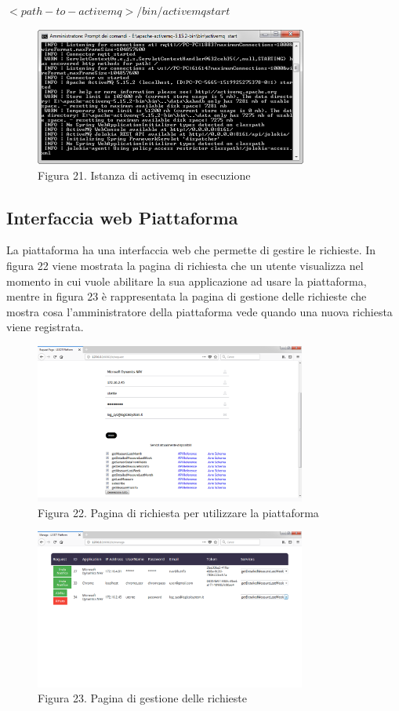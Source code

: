 $<path-to-activemq>/bin/activemq start$
\begin{figure}[h]
	\centering
	\includegraphics[width=0.8\textwidth]{activemq-in-esecuzione.png}
	\caption*{Figura 21. Istanza di activemq in esecuzione}
\end{figure}
\subsection{Interfaccia web Piattaforma}
La piattaforma ha una interfaccia web che permette di gestire le richieste. In figura 22 viene mostrata la pagina di richiesta che un utente visualizza nel momento in cui vuole abilitare la sua applicazione ad usare la piattaforma, mentre in figura 23 è rappresentata la pagina di gestione delle richieste che mostra cosa l'amministratore della piattaforma vede quando una nuova richiesta viene registrata.
\begin{figure}[h]
	\centering
	\includegraphics[width=0.8\textwidth]{pagina-di-richiesta.png}
	\caption*{Figura 22. Pagina di richiesta per utilizzare la piattaforma}
\end{figure}
\begin{figure}[h]
	\centering
	\includegraphics[width=0.8\textwidth]{gestione-delle-richieste.png}
	\caption*{Figura 23. Pagina di gestione delle richieste}
\end{figure}
